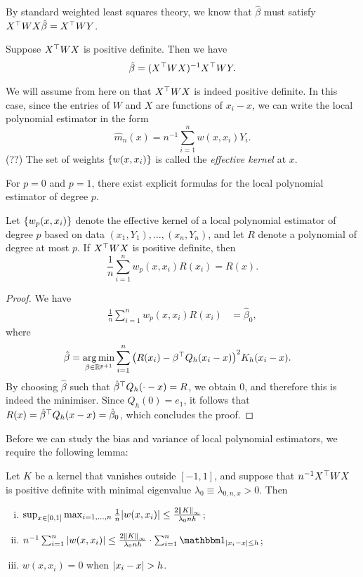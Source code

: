 By standard weighted least squares theory, we know that $\hat\beta$ must satisfy $X^\top W X\hat\beta = X^\top W Y$. 
\begin{proposition}
	Suppose $X^\top W X$ is positive definite. Then we have
	\[
	\hat\beta = (X^\top W X)^{-1} X^\top W Y. 
	\]

\end{proposition}

We will assume from here on that $X^\top W X$ is indeed positive definite. 
In this case, since the entries of $W$ and $X$ are functions of $x_i - x$, we can write the local polynomial estimator in the form
\[
\hat m_n(x) = n^{-1} \sum_{i=1}^n w(x, x_i) Y_i.
\]
(??)
The set of weights $\qty{w(x, x_i)}$ is called the \emph{effective kernel} at $x$. 

For $p = 0$ and $p = 1$, there exist explicit formulas for the local polynomial estimator of degree $p$. 

\begin{proposition} \label{prop_reproducing}
	Let $\qty{w_p(x, x_i)}$ denote the effective kernel of a local polynomial estimator of degree $p$ based on data $(x_1, Y_1), \dotsc, (x_n, Y_n)$, and let $R$ denote a polynomial of degree at most $p$. If $X^\top W X$ is positive definite, then 
	\[
	\frac1n \sum_{i=1}^n w_p(x, x_i) R(x_i) = R(x). 
	\]
\end{proposition}

\begin{proof}
	We have 
	\begin{align*}
		\frac1n \sum_{i=1}^n w_p(x, x_i) R(x_i) &= \hat\beta_0, 
	\end{align*}
where
\begin{align*}
	\hat\beta &= \operatorname*{arg\,min}_{\beta \in \mathbb R^{p + 1}} \sum_{i=1}^n \qty(R(x_i) - \beta^\top Q_h(x_i - x))^2 K_h(x_i - x).
\end{align*}
By choosing $\hat\beta$ such that $\hat\beta^\top Q_h(\cdot - x) = R$, we obtain 0, and therefore  this is indeed the minimiser. Since $Q_h(0) = e_1$, it follows that $R(x) = \hat\beta^\top Q_h(x - x) = \hat\beta_0$, which concludes the proof. 
\end{proof}

Before we can study the bias and variance of local polynomial estimators, we require the following lemma:
\begin{lemma}
	Let $K$ be a kernel that vanishes outside $[-1, 1]$, and suppose that $n^{-1} X^\top W X$ is positive definite with minimal eigenvalue $\lambda_0 \equiv \lambda_{0, n, x} > 0$. Then 
	\begin{enumerate}[(i)]
		\item $\sup_{x\in[0, 1]} \max_{i = 1, \dotsc, n} \frac1n \abs{w(x, x_i)} \leq \frac{2\norm{K}_\infty}{\lambda_0 n h}$;
		\item $n^{-1} \sum_{i=1}^n \abs{w(x, x_i)} \leq \frac{2\norm{K}_\infty}{\lambda_0 n h}\cdot  \sum_{i=1}^n \ind_{\abs{x_i - x} \leq h}$;
		\item $w(x, x_i) = 0$ when $\abs{x_i - x} > h$. 
	\end{enumerate}
\end{lemma}

